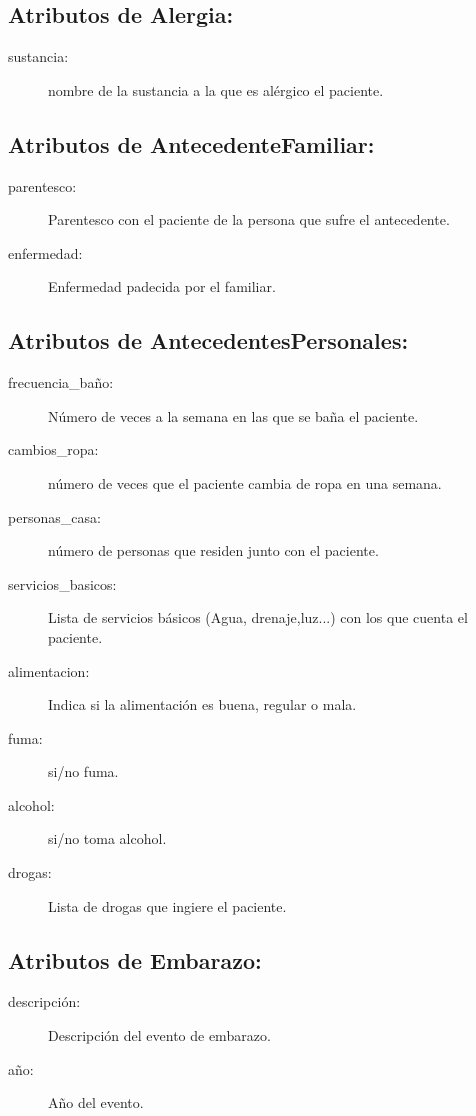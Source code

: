 \subsection{Atributos de Alergia:}
\begin{description}
\item[sustancia: ]nombre de la sustancia a la que es alérgico el paciente.
\end{description}

\subsection{Atributos de AntecedenteFamiliar:}
\begin{description}
\item[parentesco: ]Parentesco con el paciente de la persona que sufre el antecedente.
\item[enfermedad: ]Enfermedad padecida por el familiar.
\end{description}

\subsection{Atributos de AntecedentesPersonales:}
\begin{description}
\item[frecuencia\_baño: ]Número de veces a la semana en las que se baña el paciente.
\item[cambios\_ropa: ]número de veces que el paciente cambia de ropa en una semana.
\item[personas\_casa: ]número de personas que residen junto con el paciente.
\item[servicios\_basicos: ]Lista de servicios básicos (Agua, drenaje,luz...) con los que cuenta el paciente.
\item[alimentacion: ]Indica si la alimentación es buena, regular o mala.
\item[fuma: ]si/no fuma.
\item[alcohol: ]si/no toma alcohol.
\item[drogas: ]Lista de drogas que ingiere el paciente.
\end{description}

\subsection{Atributos de Embarazo:}
\begin{description}
\item[descripción: ]Descripción del evento de embarazo.
\item[año: ]Año del evento.
\end{description}

